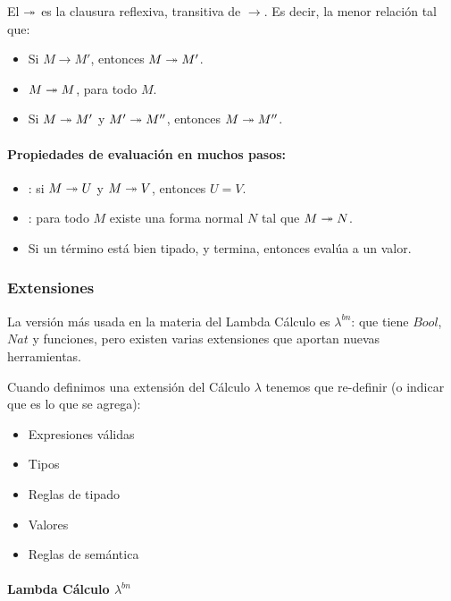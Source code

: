 \noindent
El  $\twoheadrightarrow$ es la clausura reflexiva, transitiva de $\to$. Es decir, la menor relación tal que:

\begin{itemize}
  \item Si $M\to M'$, entonces $M\twoheadrightarrow M'$.
  \item $M\twoheadrightarrow M$, para todo $M$.
  \item Si $M \twoheadrightarrow M'$ y $M' \twoheadrightarrow M''$, entonces $M \twoheadrightarrow M''$.
\end{itemize}

\paragraph{Propiedades de evaluación en muchos pasos:}

\begin{itemize}
  \item {}: si $M \twoheadrightarrow U$ y $M \twoheadrightarrow V$, entonces $U=V$.
  \item {}: para todo $M$ existe una forma normal $N$ tal que $M \twoheadrightarrow N$.
  \item Si un término está bien tipado, y termina, entonces evalúa a un valor.
\end{itemize}

\subsubsection{Extensiones}

La versión más usada en la materia del Lambda Cálculo es $\lambda^{bn}$: que tiene $Bool$, $Nat$ y funciones, pero existen varias extensiones que aportan nuevas herramientas.

Cuando definimos una extensión del Cálculo $\lambda$ tenemos que re-definir (o indicar que es lo que se agrega):
\begin{itemize}
  \item Expresiones válidas
  \item Tipos
  \item Reglas de tipado
  \item Valores
  \item Reglas de semántica
\end{itemize}

\paragraph{Lambda Cálculo $\lambda^{bn}$}

